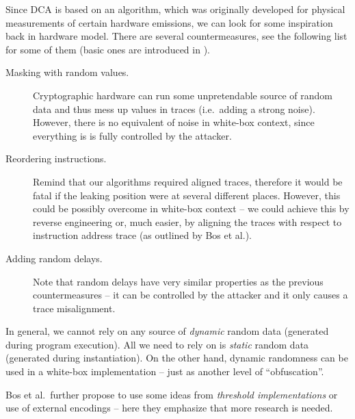 Since DCA is based on an algorithm, which was originally developed for physical measurements of certain hardware emissions, we can look for some inspiration back in hardware model. There are several countermeasures, see the following list for some of them (basic ones are introduced in \cite{chari1999towards,goubin1999des}).
\begin{description}
	\item[Masking with random values.] Cryptographic hardware can run some unpretendable source of random data and thus mess up values in traces (i.e.\ adding a strong noise). However, there is no equivalent of noise in white-box context, since everything is is fully controlled by the attacker.
	\item[Reordering instructions.] Remind that our algorithms required aligned traces, therefore it would be fatal if the leaking position were at several different places. However, this could be possibly overcome in white-box context -- we could achieve this by reverse engineering or, much easier, by aligning the traces with respect to instruction address trace (as outlined by Bos et al.).
	\item[Adding random delays.] Note that random delays have very similar properties as the previous countermeasures -- it can be controlled by the attacker and it only causes a trace misalignment.
\end{description}
In general, we cannot rely on any source of {\em dynamic} random data (generated during program execution). All we need to rely on is {\em static} random data (generated during instantiation). On the other hand, dynamic randomness can be used in a white-box implementation -- just as another level of ``obfuscation''.

Bos et al.\ further propose to use some ideas from {\em threshold implementations} \cite{nikova2006threshold} or use of external encodings -- here they emphasize that more research is needed.
